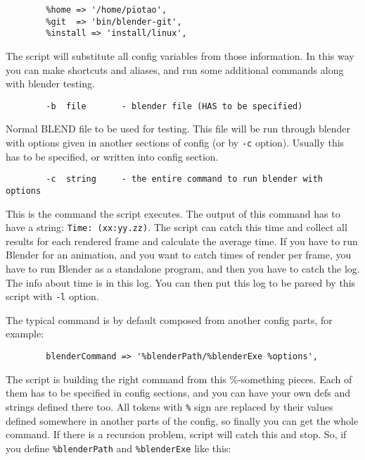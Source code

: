 \documentclass{article}
\begin{document}
\begin{verbatim}
        %home => '/home/piotao',
        %git  => 'bin/blender-git',
        %install => 'install/linux',
\end{verbatim}


The script will substitute all config variables from those information.
In this way you can make shortcuts and aliases, and run some additional
commands along with blender testing.

\begin{verbatim}
        -b  file       - blender file (HAS to be specified)
\end{verbatim}


Normal BLEND file to be used for testing. This file will be run through
blender with options given in another sections of config (or by \texttt{-c} option).
Usually this has to be specified, or written into config section.

\begin{verbatim}
        -c  string     - the entire command to run blender with options
\end{verbatim}


This is the command the script executes. The output of this command has to have
a string: \texttt{Time: (xx:yy.zz)}. The script can catch this time and collect all
results for each rendered frame and calculate the average time. If you have to
run Blender for an animation, and you want to catch times of render per frame,
you have to run Blender as a standalone program, and then you have to catch the
log. The info about time is in this log. You can then put this log to be parsed
by this script with \texttt{-l} option.



The typical command is by default composed from another config parts, for
example:

\begin{verbatim}
        blenderCommand => '%blenderPath/%blenderExe %options',
\end{verbatim}


The script is building the right command from this \%-something pieces. Each of
them has to be specified in config sections, and you can have your own defs and
strings defined there too. All tokens with \texttt{\%} sign are replaced by their
values defined somewhere in another parts of the config, so finally you can get
the whole command. If there is a recursion problem, script will catch this and
stop.  So, if you define \texttt{\%blenderPath} and \texttt{\%blenderExe} like this:
\end{document}
